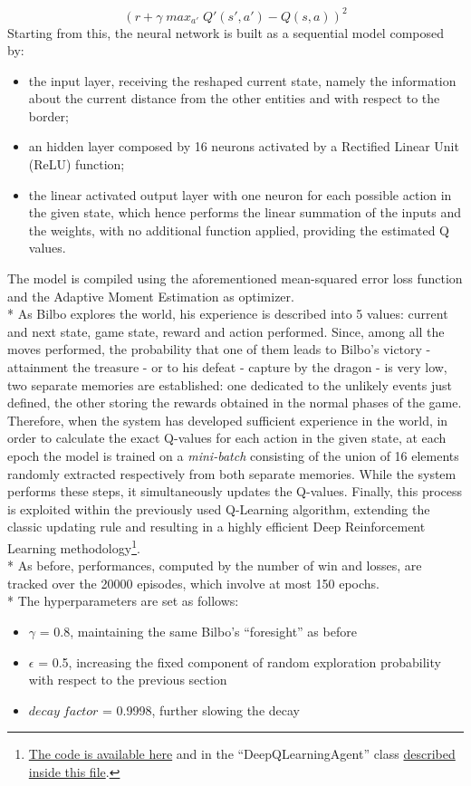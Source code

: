 $$(r+\gamma\;max_{a'}\;Q'(s',a')-Q(s,a))^2$$
Starting from this, the neural network is built as a sequential model composed by:
\begin{itemize}[noitemsep, topsep=0ex]
  \item the input layer, receiving the reshaped current state, namely the information about the current distance from the other entities and with respect to the border;
  \item an hidden layer composed by 16 neurons activated by a Rectified Linear Unit (ReLU) function; 
  \item the linear activated output layer with one neuron for each possible action in the given state, which hence performs the linear summation of the inputs and the weights, with no additional function applied, providing the estimated Q values.
\end{itemize}
The model is compiled using the aforementioned mean-squared error loss function and the Adaptive Moment Estimation as optimizer.\\*
As Bilbo explores the world, his experience is described into 5 values: current and next state, game state, reward and action performed. Since, among all the moves performed, the probability that one of them leads to Bilbo's victory - attainment the treasure - or to his defeat - capture by the dragon - is very low, two separate memories are established: one dedicated to the unlikely events just defined, the other storing the rewards obtained in the normal phases of the game. Therefore, when the system has developed sufficient experience in the world, in order to calculate the exact Q-values for each action in the given state, at each epoch the model is trained on a \textit{mini-batch} consisting of the union of 16 elements randomly extracted respectively from both separate memories. While the system performs these steps, it simultaneously updates the Q-values. Finally, this process is exploited within the previously used Q-Learning algorithm, extending the classic updating rule and resulting in a highly efficient Deep Reinforcement Learning methodology\footnote{\href{https://github.com/moiraghif/DragonHunting/blob/master/Bilbo\%20World/Bilbo_deep_feels.py}{The code is available here} and in the ``DeepQLearningAgent'' class \href{https://github.com/moiraghif/DragonHunting/blob/master/Bilbo\%20World/agents.py}{described inside this file}.}.\\*
As before, performances, computed by the number of win and losses, are tracked over the 20000 episodes, which involve at most 150 epochs.\\*
The hyperparameters are set as follows:
\begin{itemize}[noitemsep, topsep=0ex]
  \item $\gamma$ = 0.8, maintaining the same Bilbo's ``foresight'' as before
  \item $\epsilon$ = 0.5, increasing the fixed component of random exploration probability with respect to the previous section
  \item $decay\;factor$ = 0.9998, further slowing the decay
\end{itemize}

